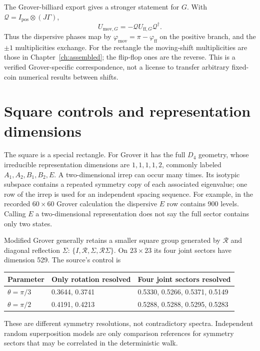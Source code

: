 \documentclass[11pt,a4paper,oneside]{report}
\newcommand{\Id}{I}
\numberwithin{equation}{chapter}
\begin{document}
The Grover-billiard export gives a stronger statement for \(G\).
With \(\mathcal Q=\Id_{\mathrm{pos}}\otimes(J\Gamma)\),
\begin{equation}
\boxed{U_{\mathrm{mov},G}=-\mathcal Q
U_{\mathrm{ff},G}\mathcal Q^\dagger.}
\end{equation}
Thus the dispersive phases map by
\(\varphi_{\mathrm{mov}}=\pi-\varphi_{\mathrm{ff}}\) on the
positive branch, and the \(\pm1\) multiplicities exchange.
For the rectangle the moving-shift multiplicities are those in
Chapter~\ref{ch:assembled}; the flip-flop ones are the reverse.
This is a verified Grover-specific correspondence, not a license to
transfer arbitrary fixed-coin numerical results between shifts.

\section{Square controls and representation dimensions}

The square is a special rectangle. For Grover it has the full
\(D_4\) geometry, whose irreducible representation dimensions are
\(1,1,1,1,2\), commonly labeled \(A_1,A_2,B_1,B_2,E\).
A two-dimensional irrep can occur many times. Its isotypic subspace
contains a repeated symmetry copy of each associated eigenvalue; one
row of the irrep is used for an independent spacing sequence. For
example, in the recorded \(60\times60\) Grover calculation the
dispersive \(E\) row contains 900 levels. Calling \(E\) a
two-dimensional representation does not say the full sector contains
only two states.

Modified Grover generally retains a smaller square group generated by
\(\mathcal R\) and diagonal reflection \(\Sigma\):
\(\{\Id,\mathcal R,\Sigma,\mathcal R\Sigma\}\). On
\(23\times23\) its four joint sectors have dimension 529.
The source's control is
\begin{center}
\small
\begin{tabular}{@{}lll@{}}
\toprule
Parameter&Only rotation resolved&Four joint sectors resolved\\
\midrule
\(\theta=\pi/3\)&0.3644, 0.3741&0.5330, 0.5266, 0.5371, 0.5149\\
\(\theta=\pi/2\)&0.4191, 0.4213&0.5288, 0.5288, 0.5295, 0.5283\\
\bottomrule
\end{tabular}
\end{center}
These are different symmetry resolutions, not contradictory spectra.
Independent random superposition models are only comparison references
for symmetry sectors that may be correlated in the deterministic walk.
\end{document}
